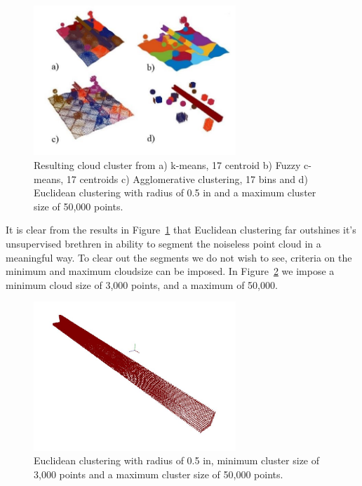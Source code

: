 \documentclass[12pt]{drexelthesis}
\begin{document}
\begin{figure}[!ht]
	\label{zeronoise:segcompare}
	\centering
		\includegraphics[width=3in]{simulated-lab-scan/0noise/all_methods.jpg}
		\caption[Comparison of unsupervised segmentation techniques on a simulated dataset.]{\centering Resulting cloud cluster from a) k-means, 17 centroid b) Fuzzy c-means, 17 centroids c) Agglomerative clustering, 17 bins and d) Euclidean clustering with radius of 0.5 in and a maximum cluster size of 50,000 points.}
	\label{zeronoise:compare}
\end{figure}

It is clear from the results in Figure~\ref{zeronoise:compare} that Euclidean clustering far outshines it's unsupervised brethren in ability to segment the noiseless point cloud in a meaningful way. To clear out the segments we do not wish to see, criteria on the minimum and maximum cloudsize can be imposed. In Figure~\ref{zeronoise:optimal} we impose a minimum cloud size of 3,000 points, and a maximum of 50,000.

\begin{figure}[!ht]
	\centering
		\includegraphics[width=3in]{simulated-lab-scan/0noise/euclidean-d05max50000min3000.jpg}
		\caption[Euclidean distance segmentation with ideal parameters.]{\centering  Euclidean clustering with radius of 0.5 in, minimum cluster size of 3,000 points and a maximum cluster size of 50,000 points.}
	\label{zeronoise:optimal}
\end{figure}
\end{document}
